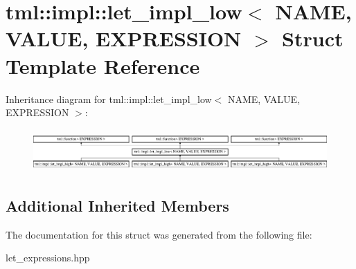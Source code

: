 \hypertarget{structtml_1_1impl_1_1let__impl__low}{\section{tml\+:\+:impl\+:\+:let\+\_\+impl\+\_\+low$<$ N\+A\+M\+E, V\+A\+L\+U\+E, E\+X\+P\+R\+E\+S\+S\+I\+O\+N $>$ Struct Template Reference}
\label{structtml_1_1impl_1_1let__impl__low}
}
Inheritance diagram for tml\+:\+:impl\+:\+:let\+\_\+impl\+\_\+low$<$ N\+A\+M\+E, V\+A\+L\+U\+E, E\+X\+P\+R\+E\+S\+S\+I\+O\+N $>$\+:\begin{figure}[H]
\begin{center}
\leavevmode
\includegraphics[height=1.642229cm]{structtml_1_1impl_1_1let__impl__low}
\end{center}
\end{figure}
\subsection*{Additional Inherited Members}


The documentation for this struct was generated from the following file\+:\begin{DoxyCompactItemize}
\item 
let\+\_\+expressions.\+hpp\end{DoxyCompactItemize}
